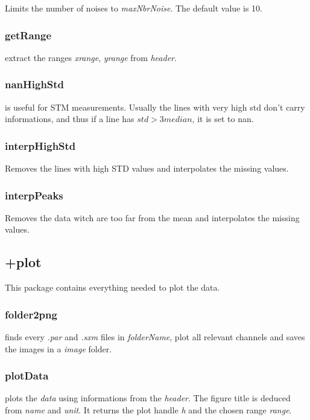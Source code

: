  Limits the number of noises to \emph{maxNbrNoise}. The default value is 10.

\edf


\subsubsection{getRange}
\bdf
{} extract the ranges \emph{xrange}, \emph{yrange} from \emph{header}.
\edf

\subsubsection{nanHighStd}
\bdf
{} is useful for STM measurements. Usually the lines with very high std don't carry informations, and thus if a line has $std > 3 median$, it is set to nan.
\edf
\subsubsection{interpHighStd}
\bdf
{} Removes the lines with high STD values and interpolates the missing values.
\edf
\subsubsection{interpPeaks}
\bdf
{} Removes the data witch are too far from the mean and interpolates the missing values.
\edf

\subsection{+plot}
This package contains everything needed to plot the data.

\subsubsection{folder2png}
\bdf
{} finds every \emph{.par} and \emph{.sxm} files in \emph{folderName}, plot all relevant channels and saves the images in a \emph{image} folder.
\edf

\subsubsection{plotData}
\bdf
{} plots the \emph{data} using informations from the \emph{header}. The figure title is deduced from \emph{name} and \emph{unit}. It returns the plot handle \emph{h} and the chosen range \emph{range}.
 
